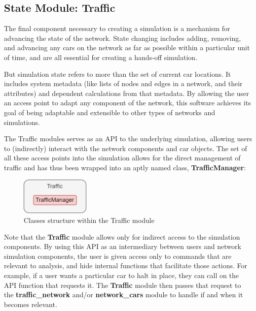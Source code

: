 \subsection{State Module:  Traffic}

\par The final component necessary to creating a simulation  is a mechanism for advancing the state of the network.  State changing includes adding, removing, and advancing any cars on the network as far as possible within a particular unit of time, and are all essential for creating a hands-off simulation. \\

\par But simulation state refers to more than the set of current car locations.  It includes system metadata (like lists of nodes and edges in a network, and their attributes) and dependent calculations from that metadata.  By allowing the user an access point to adapt any component of the network, this software achieves its goal of being adaptable and extensible to other types of networks and simulations.  \\

\par The Traffic modules serves as an API to the underlying simulation, allowing users to (indirectly) interact with the network components and car objects.  The set of all these access points into the simulation allows for the direct management of traffic and has thus been wrapped into an aptly named class,  \textbf{TrafficManager}:

\begin{figure}[H]
    \centering
	\includegraphics[width=0.3\textwidth]{tex files/Figures/traffic_manager_module.png}
	\caption[State Module:  Traffic\_cars]{Classes structure within the Traffic module}
	\label{fig:traffic_module}
\end{figure}


\noindent  Note that the \textbf{Traffic} module allows only for indirect access to the simulation components.  By using this API as an intermediary between users and network simulation components, the user is given access only to commands that are relevant to analysis, and hide internal functions that facilitate those actions.  For example, if a user wants a particular car to halt in place, they can call on the API function that requests it.  The \textbf{Traffic} module then passes that request to the \textbf{traffic\_network} and/or \textbf{network\_cars} module to handle if and when it becomes relevant.


